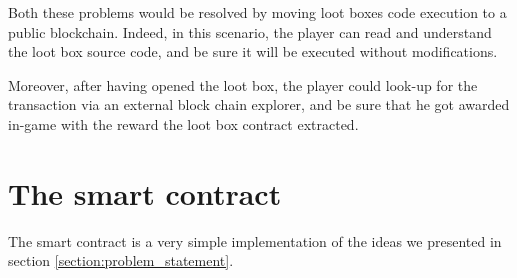 \documentclass[12pt]{article}
\begin{document}
Both these problems would be resolved by moving loot boxes code execution to a public blockchain. Indeed, in this scenario, the player can read and understand the loot box source code, and be sure it will be executed without modifications.

Moreover, after having opened the loot box, the player could look-up for the transaction via an external block chain explorer, and be sure that he got awarded in-game with the reward the loot box contract extracted.

\section{The smart contract} \label{section:the_smart_contract}
The smart contract is a very simple implementation of the ideas we presented in section \ref{section:problem_statement}.
\end{document}
